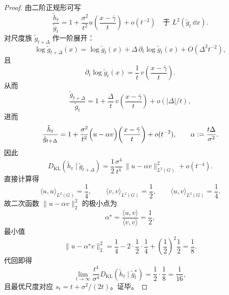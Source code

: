 \begin{proof}
由二阶正规形可写
\[
\frac{\tilde h_t}{\tilde g_t}
=1+\frac{\sigma^2}{t^2}u\!\left(\frac{x-\bar\gamma}{t}\right)+o(t^{-2})
\quad\text{于 }L^2(\tilde g_t\,\dd x).
\]
对尺度族 \(\tilde g_{t+\Delta}\) 作一阶展开：
\[
\log \tilde g_{t+\Delta}(x)
=\log \tilde g_t(x)+\Delta\,\partial_t\log\tilde g_t(x)+O(\Delta^2t^{-2}),
\]
且
\[
\partial_t\log\tilde g_t(x)
=\frac{1}{t}\,v\!\left(\frac{x-\bar\gamma}{t}\right).
\]
从而
\[
\frac{\tilde g_{t+\Delta}}{\tilde g_t}
=1+\frac{\Delta}{t}\,v\!\left(\frac{x-\bar\gamma}{t}\right)+o(|\Delta|/t),
\]
进而
\[
\frac{\tilde h_t}{\tilde g_{t+\Delta}}
=1+\frac{\sigma^2}{t^2}
\Bigl(u-\alpha v\Bigr)\!\left(\frac{x-\bar\gamma}{t}\right)
+o(t^{-2}),
\qquad
\alpha:=\frac{t\Delta}{\sigma^2}.
\]
因此
\[
D_{\mathrm{KL}}(\tilde h_t\mid \tilde g_{t+\Delta})
=\frac12\frac{\sigma^4}{t^4}\,\|u-\alpha v\|_{L^2(G)}^2+o(t^{-4}).
\]
直接计算得
\[
\langle u,u\rangle_{L^2(G)}=\frac14,\qquad
\langle v,v\rangle_{L^2(G)}=\frac12,\qquad
\langle u,v\rangle_{L^2(G)}=\frac14.
\]
故二次函数 \(\|u-\alpha v\|_2^2\) 的极小点为
\[
\alpha^\star=\frac{\langle u,v\rangle}{\langle v,v\rangle}=\frac12,
\]
最小值
\[
\|u-\alpha^\star v\|_2^2
=\frac14-2\cdot\frac12\cdot\frac14+\left(\frac12\right)^2\frac12
=\frac18.
\]
代回即得
\[
\lim_{t\to\infty}\frac{t^4}{\sigma^4}D_{\mathrm{KL}}(\tilde h_t\mid \tilde g_t^\star)
=\frac12\cdot\frac18=\frac{1}{16},
\]
且最优尺度对应 \(s_t=t+\sigma^2/(2t)\)。证毕。
\end{proof}

